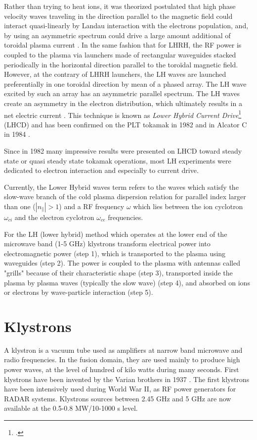 Rather than trying to heat ions, it was theorized postulated that high phase velocity waves traveling in the direction parallel to the magnetic field could interact quasi-linearly by Landau interaction with the electrons population, and, by using an asymmetric spectrum could drive a large amount additional of toroidal plasma current \parencite{Fisch1978}. In the same fashion that for LHRH, the RF power is coupled to the plasma via launchers made of rectangular waveguides stacked periodically in the horizontal direction parallel to the toroïdal magnetic field. However, at the contrary of LHRH launchers, the LH waves are launched preferentially in one toroidal direction by mean of a phased array. The LH wave excited by such an array has an asymmetric parallel spectrum. The LH waves create an asymmetry in the electron distribution, which ultimately results in a net electric current \parencite{Fisch1987}. This technique is known as \emph{Lower Hybrid Current Drive}\footcite{Despite the fact that the Lower Hybrid resonance is not anymore involved in the use of this method in tokamaks, the term remained.} (LHCD) and has been confirmed on the PLT tokamak in 1982 \parencite{Bernabei1982, Motley1985, Jobes1985} and in Alcator C in 1984 \parencite{Porkolab1984}. 

Since in 1982 many impressive results were presented on LHCD\parencite{Hooke1982, Porkolab1982, Tonon1982} toward steady state or quasi steady state tokamak operations, most LH experiments were dedicated to electron interaction and especially to current drive. 

Currently, the Lower Hybrid waves term refers to the waves which satisfy the slow-wave branch of the cold plasma dispersion relation for parallel index larger than one ($|n_{\parallel}|>1$) and a RF frequency $\omega$ which lies between the ion cyclotron $\omega_{ci}$ and the electron cyclotron $\omega_{ce}$ frequencies. 

For the LH (lower hybrid) method which operates at the lower end of the microwave band (1-5 GHz) klystrons transform electrical power into electromagnetic power (step 1), which is transported to the plasma using waveguides (step 2). The power is coupled to the plasma with antennas called "grills" because of their characteristic shape (step 3), transported inside the plasma by plasma waves (typically the slow wave) (step 4), and absorbed on ions or electrons by wave-particle interaction (step 5).

\section{Klystrons}
A klystron is a vacuum tube used as amplifiers at narrow band microwave and radio frequencies. In the fusion domain, they are used mainly to produce high power waves, at the level of hundred of kilo watts during many seconds. First klystrons have been invented by the Varian brothers in 1937 \parencite{Pond2008}. The first klystrons have been intensively used during World War II, as RF power generators for RADAR systems. Klystrons sources between 2.45 GHz and 5 GHz are now available at the 0.5-0.8 MW/10-1000 s level\parencite{Pond2008}. 


